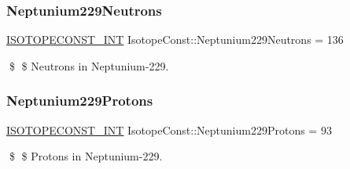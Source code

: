\subsubsection{\texorpdfstring{Neptunium229\+Neutrons}{Neptunium229Neutrons}}
{\footnotesize\ttfamily \mbox{\hyperlink{group___isotope_const-_macros_ga5f18360b3e99483a35c32d789e62621c}{I\+S\+O\+T\+O\+P\+E\+C\+O\+N\+S\+T\+\_\+\+I\+NT}} Isotope\+Const\+::\+Neptunium229\+Neutrons = 136}

\$ \$ Neutrons in Neptunium-\/229. \mbox{\label{group___isotope_const-_neptunium-_np229_gac617aac0a12a2a2fa26e1b796376c3de}} 
\subsubsection{\texorpdfstring{Neptunium229\+Protons}{Neptunium229Protons}}
{\footnotesize\ttfamily \mbox{\hyperlink{group___isotope_const-_macros_ga5f18360b3e99483a35c32d789e62621c}{I\+S\+O\+T\+O\+P\+E\+C\+O\+N\+S\+T\+\_\+\+I\+NT}} Isotope\+Const\+::\+Neptunium229\+Protons = 93}

\$ \$ Protons in Neptunium-\/229. 